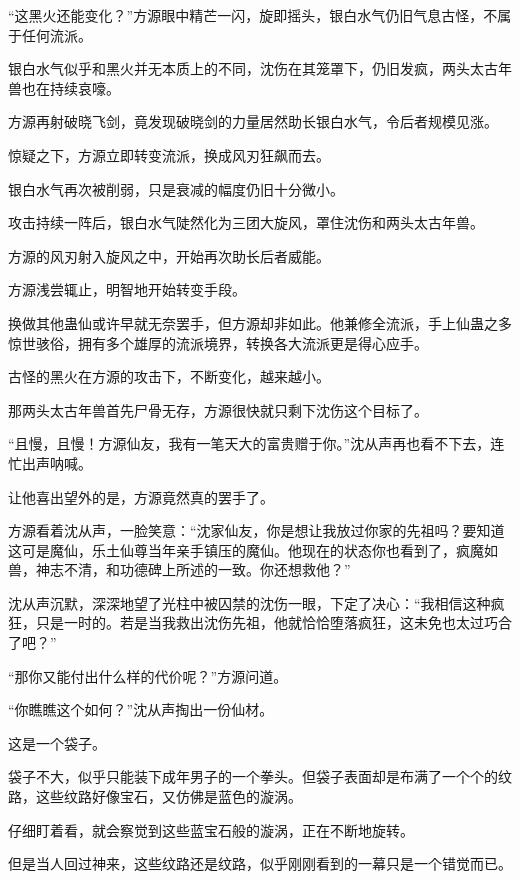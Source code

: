
\begin{this_body}

“这黑火还能变化？”方源眼中精芒一闪，旋即摇头，银白水气仍旧气息古怪，不属于任何流派。

银白水气似乎和黑火并无本质上的不同，沈伤在其笼罩下，仍旧发疯，两头太古年兽也在持续哀嚎。

方源再射破晓飞剑，竟发现破晓剑的力量居然助长银白水气，令后者规模见涨。

惊疑之下，方源立即转变流派，换成风刃狂飙而去。

银白水气再次被削弱，只是衰减的幅度仍旧十分微小。

攻击持续一阵后，银白水气陡然化为三团大旋风，罩住沈伤和两头太古年兽。

方源的风刃射入旋风之中，开始再次助长后者威能。

方源浅尝辄止，明智地开始转变手段。

换做其他蛊仙或许早就无奈罢手，但方源却非如此。他兼修全流派，手上仙蛊之多惊世骇俗，拥有多个雄厚的流派境界，转换各大流派更是得心应手。

古怪的黑火在方源的攻击下，不断变化，越来越小。

那两头太古年兽首先尸骨无存，方源很快就只剩下沈伤这个目标了。

“且慢，且慢！方源仙友，我有一笔天大的富贵赠于你。”沈从声再也看不下去，连忙出声呐喊。

让他喜出望外的是，方源竟然真的罢手了。

方源看着沈从声，一脸笑意：“沈家仙友，你是想让我放过你家的先祖吗？要知道这可是魔仙，乐土仙尊当年亲手镇压的魔仙。他现在的状态你也看到了，疯魔如兽，神志不清，和功德碑上所述的一致。你还想救他？”

沈从声沉默，深深地望了光柱中被囚禁的沈伤一眼，下定了决心：“我相信这种疯狂，只是一时的。若是当我救出沈伤先祖，他就恰恰堕落疯狂，这未免也太过巧合了吧？”

“那你又能付出什么样的代价呢？”方源问道。

“你瞧瞧这个如何？”沈从声掏出一份仙材。

这是一个袋子。

袋子不大，似乎只能装下成年男子的一个拳头。但袋子表面却是布满了一个个的纹路，这些纹路好像宝石，又仿佛是蓝色的漩涡。

仔细盯着看，就会察觉到这些蓝宝石般的漩涡，正在不断地旋转。

但是当人回过神来，这些纹路还是纹路，似乎刚刚看到的一幕只是一个错觉而已。


\end{this_body}
